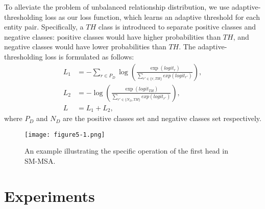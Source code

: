 \documentclass[sigconf,natbib=true]{acmart}
\begin{document}
To alleviate the problem of unbalanced relationship distribution, we use adaptive-thresholding loss \cite{c:106} as our loss function, which learns an adaptive threshold for each entity pair.
Specifically, a $TH$ class is introduced to separate positive classes and negative classes: positive classes would have higher probabilities than $TH$, and negative classes would have lower probabilities than $TH$.
The adaptive-thresholding loss is formulated as follows:
\begin{equation}
	\begin{split}
	    L_1&={-}\sum_{r{\in}P_D} \log \left(\frac{\exp(logit_r)}{\sum_{r'{\in}\{r,TH\}} exp(logit_{r'})}\right) ,\\
	    L_2&={-}\log \left(\frac{\exp(logit_{TH})}{\sum_{r'{\in}\{N_D,TH\}} exp(logit_{r'})} \right) ,\\
	    L&=L_1+L_2 ,
	\end{split}
\end{equation}
where $P_D$ and $N_D$ are the positive classes set and negative classes set respectively.

\begin{figure}[t]
\centering
\texttt{[image: figure5-1.png]}
\caption{
An example illustrating the specific operation of the first head in SM-MSA.
}
\label{fig5}
\end{figure}

\section{Experiments}
\end{document}
